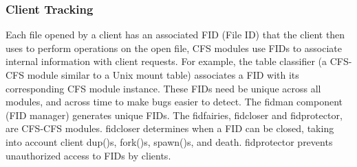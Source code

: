 \subsubsection{Client Tracking}

Each file opened by a client has an associated FID (File ID) that the
client then uses to perform operations on the open file, CFS modules use
FIDs to associate internal information with client requests. For example,
the table classifier (a CFS-CFS module similar to a Unix mount table)
associates a FID with its corresponding CFS module instance. These FIDs
need be unique across all modules, and across time to make bugs easier to
detect. The fidman component (FID manager) generates unique FIDs. The
fidfairies, fidcloser and fidprotector, are CFS-CFS modules. fidcloser
determines when a FID can be closed, taking into account client dup()s,
fork()s, spawn()s, and death. fidprotector prevents unauthorized access to
FIDs by clients.
